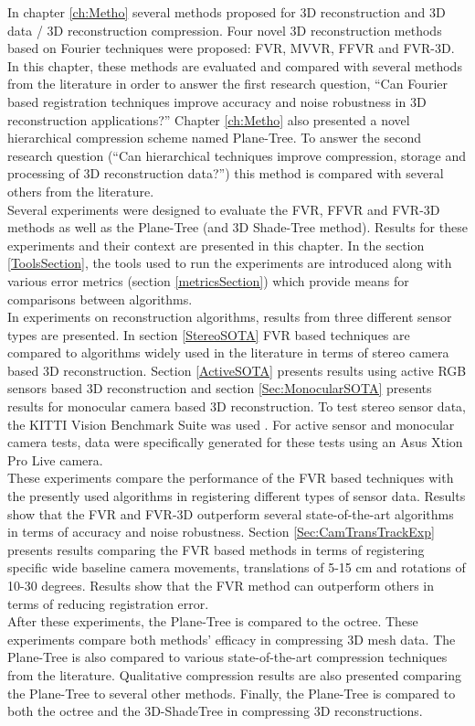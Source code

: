 
In chapter \ref{ch:Metho} several methods proposed for 3D reconstruction and 3D data / 3D reconstruction compression. Four novel 3D reconstruction methods based on Fourier techniques were proposed: FVR, MVVR, FFVR and FVR-3D. In this chapter, these methods are evaluated and compared with several methods from the literature in order to answer the first research question, ``Can Fourier based registration techniques improve accuracy and noise robustness in 3D reconstruction applications?'' Chapter \ref{ch:Metho} also presented a novel hierarchical compression scheme named Plane-Tree. To answer the second research question (``Can hierarchical techniques improve compression, storage and processing of 3D reconstruction data?'') this method is compared with several others from the literature. \\

Several experiments were designed to evaluate the FVR, FFVR and FVR-3D methods as well as the Plane-Tree (and 3D Shade-Tree method). Results for these experiments and their context are presented in this chapter. In the section \ref{ToolsSection}, the tools used to run the experiments are introduced along with various error metrics (section \ref{metricsSection}) which provide means for comparisons between algorithms. \\

In experiments on reconstruction algorithms, results from three different sensor types are presented. In section \ref{StereoSOTA} FVR based techniques are compared to algorithms widely used in the literature in terms of stereo camera based 3D reconstruction. Section \ref{ActiveSOTA} presents results using active RGB sensors based 3D reconstruction and section \ref{Sec:MonocularSOTA} presents results for monocular camera based 3D reconstruction. To test stereo sensor data, the KITTI Vision Benchmark Suite was used \cite{Geiger13Vision}. For active sensor and monocular camera tests, data were specifically generated for these tests using an Asus Xtion Pro Live camera. \\

These experiments compare the performance of the FVR based techniques with the presently used algorithms in registering different types of sensor data. Results show that the FVR and FVR-3D outperform several state-of-the-art algorithms in terms of accuracy and noise robustness. Section \ref{Sec:CamTransTrackExp} presents results comparing the FVR based methods in terms of registering specific wide baseline camera movements, translations of 5-15 cm and rotations of 10-30 degrees. Results show that the FVR method can outperform others in terms of reducing registration error. \\

After these experiments, the Plane-Tree is compared to the octree. These experiments compare both methods' efficacy in compressing 3D mesh data. The Plane-Tree is also compared to various state-of-the-art compression techniques from the literature. Qualitative compression results are also presented comparing the Plane-Tree to several other methods. Finally, the Plane-Tree is compared to both the octree and the 3D-ShadeTree in compressing 3D reconstructions. \\
